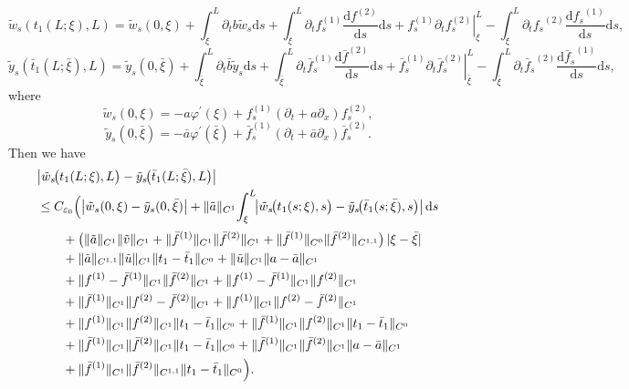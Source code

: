 \documentclass[a4paper,reqno,11pt]{amsart}
\numberwithin{equation}{section} %
\begin{document}
$$
\tilde{w}_s\left( t_1(L;\xi ),L \right) =\tilde{w}_s(0,\xi )+\int_{\xi}^L{\partial _tb\tilde{w}_s\mathrm{d}s}+\int_{\xi}^L{\partial _tf_{s}^{(1)}\frac{\mathrm{d}f^{(2)}}{\mathrm{d}s}\mathrm{d}s}+\left. f_{s}^{(1)}\partial _tf_{s}^{(2)} \right|_{\xi}^{L}-\int_{\xi}^L{\partial _t{f_s}^{(2)}\frac{\mathrm{d}{f_s}^{(1)}}{\mathrm{d}s}\mathrm{d}s},
$$
$$
\tilde{y}_s\left( \bar{t}_1(L;\bar{\xi}),L \right) =\tilde{y}_s(0,\bar{\xi})+\int_{\bar{\xi}}^L{\partial _t\bar{b}\tilde{y}_s\mathrm{d}s}+\int_{\bar{\xi}}^L{\partial _t\bar{f}_{s}^{(1)}\frac{\mathrm{d}\bar{f}^{(2)}}{\mathrm{d}s}\mathrm{d}s}+\left. \bar{f}_{s}^{(1)}\partial _t\bar{f}_{s}^{(2)} \right|_{\bar{\xi}}^{L}-\int_{\bar{\xi}}^L{\partial _t{\bar{f}_s}^{(2)}\frac{\mathrm{d}{\bar{f}_s}^{(1)}}{\mathrm{d}s}\mathrm{d}s},
$$
where 
$$
\tilde{w}_s(0,\xi )=-a\varphi ^{\prime}(\xi )+f_{s}^{(1)}\left( \partial _t+a\partial _x \right) f_{s}^{(2)},
$$
$$
\tilde{y}_s(0,\bar{\xi})=-\bar{a}\varphi ^{\prime}(\bar{\xi})+\bar{f}_{s}^{(1)}\left( \partial _t+\bar{a}\partial _x \right) \bar{f}_{s}^{(2)}.
$$
Then we have
$$
\begin{aligned}
&\bigl|\tilde w_s\!\bigl(t_1(L;\xi),L\bigr)-\tilde y_s\!\bigl(\bar t_1(L;\bar\xi),L\bigr)\bigr|
\\
&\le C_{\varepsilon_0}\Bigl(
   \bigl|\tilde w_s(0,\xi)-\tilde y_s(0,\bar\xi)\bigr|
   + \|\tilde a\|_{C^{1}}\!\int_{\xi}^{L}\!\bigl|\tilde w_s\!\bigl(t_1(s;\xi),s\bigr)-\tilde y_s\!\bigl(\bar t_1(s;\bar\xi),s\bigr)\bigr|\,\mathrm{d}s
\\[2pt]
&\qquad
   + \bigl(\|\tilde a\|_{C^{1}}\|\tilde v\|_{C^{1}}
     + \|\bar f^{(1)}\|_{C^{1}}\|\bar f^{(2)}\|_{C^{1}}
     + \|\bar f^{(1)}\|_{C^{0}}\|\bar f^{(2)}\|_{C^{1,1}}\bigr)\,|\xi-\bar\xi|
\\
&\qquad
   + \|\tilde a\|_{C^{1,1}}\|\tilde u\|_{C^{1}}\|t_1-\bar t_1\|_{C^{0}}
   + \|\tilde u\|_{C^{1}}\|a-\bar a\|_{C^{1}}
\\
&\qquad
   + \|f^{(1)}-\bar f^{(1)}\|_{C^{1}}\|\bar f^{(2)}\|_{C^{1}}
   + \|f^{(1)}-\bar f^{(1)}\|_{C^{1}}\|f^{(2)}\|_{C^{1}}
\\
&\qquad
   + \|\bar f^{(1)}\|_{C^{1}}\|f^{(2)}-\bar f^{(2)}\|_{C^{1}}
   + \|f^{(1)}\|_{C^{1}}\|f^{(2)}-\bar f^{(2)}\|_{C^{1}}
\\
&\qquad
   + \|f^{(1)}\|_{C^{1}}\|f^{(2)}\|_{C^{1}}\|t_1-\bar t_1\|_{C^{0}}
   + \|\bar f^{(1)}\|_{C^{1}}\|f^{(2)}\|_{C^{1}}\|t_1-\bar t_1\|_{C^{0}}
\\
&\qquad
   + \|\bar f^{(1)}\|_{C^{1}}\|\bar f^{(2)}\|_{C^{1}}\|t_1-\bar t_1\|_{C^{0}}
   + \|\bar f^{(1)}\|_{C^{1}}\|\bar f^{(2)}\|_{C^{1}}\|a-\bar a\|_{C^{1}}
\\
&\qquad
   + \|\bar f^{(1)}\|_{C^{1}}\|\bar f^{(2)}\|_{C^{1,1}}\|t_1-\bar t_1\|_{C^{0}}
\Bigr).
\end{aligned}
$$
\end{document}
